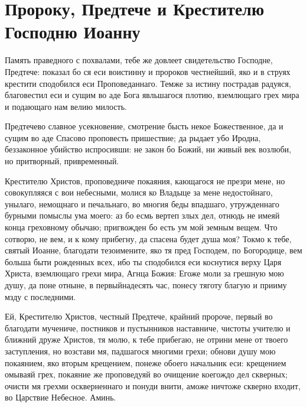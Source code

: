 \section{Пророку, Предтече и Крестителю Господню Иоанну}\begin{mymulticols}


Память праведного с похвалами, тебе же довлеет свидетельство Господне, Предтече: показал бо ся еси воистинну и пророков честнейший, яко и в струях крестити сподобился еси Проповеданнаго. Темже за истину пострадав радуяся, благовестил еси и сущим во аде Бога явльшагося плотию, вземлющаго грех мира и подающаго нам велию милость.


Предтечево славное усекновение, смотрение бысть некое Божественное, да и сущим во аде Спасово проповесть пришествие; да рыдает убо Иродиа, беззаконное убийство испросивши: не закон бо Божий, ни живый век возлюби, но притворный, привременный.


Крестителю Христов, проповедниче покаяния, кающагося не презри мене, но совокупляяся с вои небесными, молися ко Владыце за мене недостойнаго, унылаго, немощнаго и печальнаго, во многия беды впадшаго, утружденнаго бурными помыслы ума моего: аз бо есмь вертеп злых дел, отнюдь не имеяй конца греховному обычаю; пригвожден бо есть ум мой земным вещем. Что сотворю, не вем, и к кому прибегну, да спасена будет душа моя? Токмо к тебе, святый Иоанне, благодати тезоимените, яко тя пред Господем, по Богородице, вем больша быти рожденных всех, ибо ты сподобился еси коснутися верху Царя Христа, вземлющаго грехи мира, Агнца Божия: Егоже моли за грешную мою душу, да поне отныне, в первыйнадесять час, понесу тяготу благую и прииму мзду с последними.

Ей, Крестителю Христов, честный Предтече, крайний пророче, первый во благодати мучениче, постников и пустынников наставниче, чистоты учителю и ближний друже Христов, тя молю, к тебе прибегаю, не отрини мене от твоего заступления, но возстави мя, падшагося многими грехи; обнови душу мою покаянием, яко вторым крещением, понеже обоего начальник еси: крещением омываяй грех, покаяние же проповедуяй во очищение коегождо дел скверных; очисти мя грехми оскверненнаго и понуди внити, аможе ничтоже скверно входит, во Царствие Небесное. Аминь.

\end{mymulticols}

